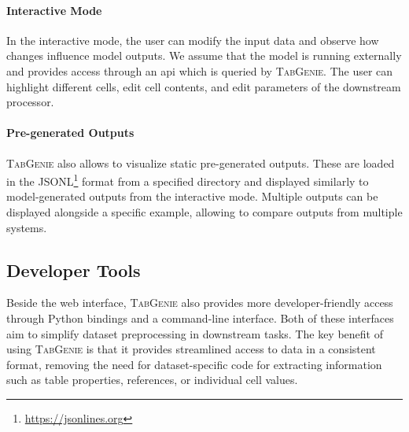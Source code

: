 \paragraph{Interactive Mode} In the interactive mode, the user can modify the input data and observe how changes influence model outputs. We assume that the model is running externally and provides access through an \acs{api} which is queried by \textsc{TabGenie}. The user can highlight different cells, edit cell contents, and edit parameters of the downstream processor.



\paragraph{Pre-generated Outputs} \textsc{TabGenie} also allows to visualize static pre-generated outputs. These are loaded in the JSONL\footnote{\url{https://jsonlines.org}} format from a specified directory and displayed similarly to model-generated outputs from the interactive mode. Multiple outputs can be displayed alongside a specific example, allowing to compare outputs from multiple systems.


\subsection{Developer Tools}
\label{sec:tabgenie:developer}
Beside the web interface, \textsc{TabGenie} also provides more developer-friendly access through Python bindings and a command-line interface. Both of these interfaces aim to simplify dataset preprocessing in downstream tasks. The key benefit of using \textsc{TabGenie} is that it provides streamlined access to data in a consistent format, removing the need for dataset-specific code for extracting information such as table properties, references, or individual cell values.



